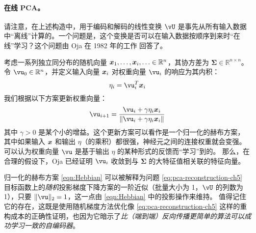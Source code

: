 \documentclass[../../book-main.tex]{subfiles}
\begin{document}
\paragraph{在线 PCA。} 请注意，在上述构造中，用于编码和解码的线性变换 $\vU$ 是事先从所有输入数据中“离线”计算的。一个问题是，这个变换是否可以在输入数据按顺序到来时“在线”学习？这个问题由 Oja 在 1982 年的工作 \cite{Oja1982SimplifiedNM} 回答了。
\begin{example} 考虑一系列独立同分布的随机向量 $\bm{x}_1, \ldots, \bm{x}_i, \ldots \in
  \mathbb{R}^n$，其协方差为 $\boldsymbol{\Sigma} \in
  \mathbb{R}^{n\times n}$。令 $\vu_0 \in \mathbb{R}^n$，并定义输入向量 $\bm{x}_i$ 对权重向量 $\vu_i$ 的响应为其内积：
  \begin{equation}
    \eta_i = \vu_i^T \x_i
  \end{equation}
  我们根据以下方案更新权重向量：
  \begin{equation}
    \vu_{i+1} = \frac{\vu_i + \gamma \eta_i \x_i}{\|\vu_i + \gamma
    \eta_i \x_i\|}
    \label{eqn:Hebbian}
  \end{equation}
  其中 $\gamma >0$ 是某个小的增益。这个更新方案可以看作是一个归一化的赫布方案，其中如果输入 $\bm{x}$ 和输出 $\eta$（的乘积）都很强，神经元之间的连接权重就会变强。可以认为权重向量 $\vu$ 是基于输出 $\eta$ 的某种形式的反馈而“学习”到的。
  那么，在合理的假设下，Oja \cite{Oja1982SimplifiedNM} 已经证明 $\vu_i$ 收敛到与 $\boldsymbol{\Sigma}$ 的大特征值相关联的特征向量。
\end{example}

归一化的赫布方案 \eqref{eqn:Hebbian} 可以被解释为问题 \eqref{eq:pca-reconstruction-ch5} 目标函数上的\textit{随机}投影梯度下降方案的一阶近似（批量大小为 1，$\vU$ 的列数为 1），只要 $\norm{\vu}_2 = 1$，这一点由 \eqref{eqn:Hebbian} 中的投影操作来维持。
值得记住它的存在，这既是使用随机梯度方法优化像 \eqref{eq:pca-reconstruction-ch5} 这样的重构成本的正确性证明，也因为它暗示了\textit{比（端到端）反向传播更简单的算法可以成功学习一致的自编码器}。
\end{document}

